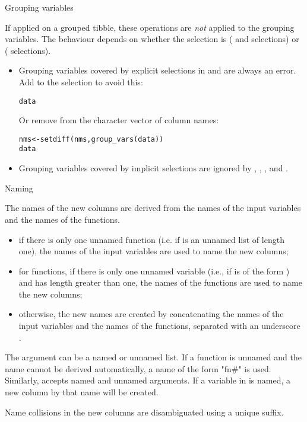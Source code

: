 \documentclass[a4paper]{book}
\begin{document}
\begin{Section}{Grouping variables}


If applied on a grouped tibble, these operations are \emph{not} applied
to the grouping variables. The behaviour depends on whether the
selection is  ( and  selections) or
 ( selections).
\begin{itemize}

\item{} Grouping variables covered by explicit selections in
 and  are always an error. Add
 to the  selection to avoid this:

\begin{alltt}data %>% mutate_at(vars(-group_cols(), ...), myoperation)
\end{alltt}


Or remove  from the character vector of column names:

\begin{alltt}nms <- setdiff(nms, group_vars(data))
data %>% mutate_at(vars, myoperation)
\end{alltt}

\item{} Grouping variables covered by implicit selections are ignored by
, , , and
.

\end{itemize}

\end{Section}
%
\begin{Section}{Naming}


The names of the new columns are derived from the names of the
input variables and the names of the functions.
\begin{itemize}

\item{} if there is only one unnamed function (i.e. if  is an unnamed list
of length one),
the names of the input variables are used to name the new columns;
\item{} for  functions, if there is only one unnamed variable (i.e.,
if  is of the form ) and  has length
greater than one,
the names of the functions are used to name the new columns;
\item{} otherwise, the new names are created by
concatenating the names of the input variables and the names of the
functions, separated with an underscore .

\end{itemize}


The  argument can be a named or unnamed list.
If a function is unnamed and the name cannot be derived automatically,
a name of the form "fn\#" is used.
Similarly,  accepts named and unnamed arguments.
If a variable in  is named, a new column by that name will be created.

Name collisions in the new columns are disambiguated using a unique suffix.
\end{Section}
\end{document}
